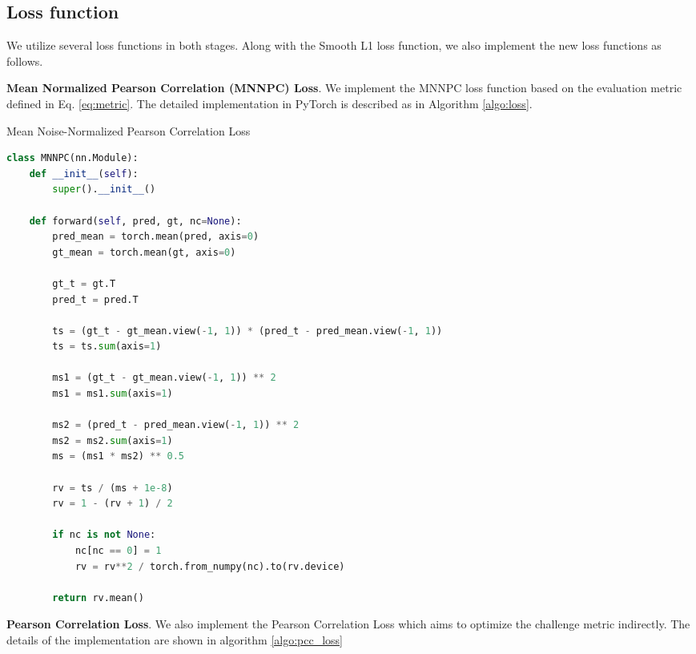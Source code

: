 \documentclass{article}
\begin{document}
\subsection{Loss function}
We utilize several loss functions in both stages. Along with the Smooth L1 loss function, we also implement the new loss functions as follows. 

\textbf{ Mean Normalized Pearson Correlation (MNNPC) Loss}. We implement the MNNPC loss function based on the evaluation metric defined in Eq. \eqref{eq:metric}. The detailed implementation in PyTorch is described as in Algorithm \eqref{algo:loss}.

\begin{algorithm}[!ht]
   \caption{Mean Noise-Normalized Pearson Correlation Loss}
   \label{algo:loss}
\begin{lstlisting}[language=python]
class MNNPC(nn.Module):
    def __init__(self):
        super().__init__()

    def forward(self, pred, gt, nc=None):
        pred_mean = torch.mean(pred, axis=0)
        gt_mean = torch.mean(gt, axis=0)

        gt_t = gt.T
        pred_t = pred.T

        ts = (gt_t - gt_mean.view(-1, 1)) * (pred_t - pred_mean.view(-1, 1))
        ts = ts.sum(axis=1)

        ms1 = (gt_t - gt_mean.view(-1, 1)) ** 2
        ms1 = ms1.sum(axis=1)

        ms2 = (pred_t - pred_mean.view(-1, 1)) ** 2
        ms2 = ms2.sum(axis=1)
        ms = (ms1 * ms2) ** 0.5

        rv = ts / (ms + 1e-8)
        rv = 1 - (rv + 1) / 2

        if nc is not None:
            nc[nc == 0] = 1
            rv = rv**2 / torch.from_numpy(nc).to(rv.device)

        return rv.mean()
\end{lstlisting}
\end{algorithm}
\textbf{Pearson Correlation Loss}. We also implement the Pearson Correlation Loss which aims to optimize the challenge metric indirectly. The details of the implementation are shown in algorithm \ref{algo:pcc_loss}
\end{document}
